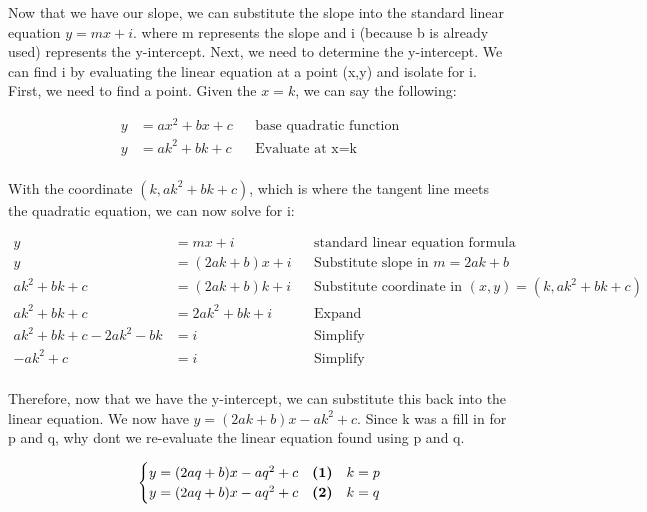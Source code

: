 \documentclass[12pt]{book}
\begin{document}
\begin{enumerate}
\vspace{-1cm}
Now that we have our slope, we can substitute the slope into the standard 
linear equation $y=mx+i$. where m represents the slope and i (because b is 
already used) represents the y-intercept. Next, we need to determine the 
y-intercept. We can find i by evaluating the linear equation at a point (x,y) 
and isolate for i. First, we need to find a point. Given the $x=k$, we can say the following:

\vspace{-0.3cm}
\addtolength{\jot}{0.4em}
\begin{align*}
    y &= ax^2+bx+c && \text{base quadratic function} \\
    y &= ak^2+bk+c && \text{Evaluate at x=k} \\
\end{align*}

\vspace{-1cm}
With the coordinate $(k,ak^2+bk+c)$, which is where the tangent line 
meets the quadratic equation, we can now solve for i:

\vspace{-0.3cm}
\addtolength{\jot}{0.3em}
\begin{align*}
    y &= mx + i && \text{standard linear equation formula} \\
    y &= (2ak+b)x + i && \text{Substitute slope in } m = 2ak+b \\
    ak^2+bk+c &= (2ak+b)k + i && \text{Substitute coordinate in } (x,y) = (k,ak^2+bk+c) \\
    ak^2+bk+c &= 2ak^2+bk + i && \text{Expand} \\
    ak^2+bk+c - 2ak^2 - bk &= i && \text{Simplify} \\
    -ak^2+c &= i && \text{Simplify} \\
\end{align*}

\newpage

Therefore, now that we have the y-intercept, we can substitute 
this back into the linear equation. We now have $y = (2ak+b)x - ak^2+c$. 
Since k was a fill in for p and q, why dont we re-evaluate the linear equation 
found using p and q. 

\[ \begin{cases} 
    y = (2aq+b)x - aq^2+c & \textbf{(1)} \text{\space \space \space} k=p \\
    y = (2aq+b)x - aq^2+c & \textbf{(2)} \text{\space \space \space} k=q
 \end{cases}
\]


\end{enumerate}
\end{document}
